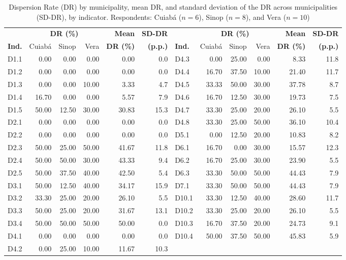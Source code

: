 \documentclass[12pt]{article}
\begin{document}
\begin{table}[tb]
\centering\footnotesize
\setlength{\tabcolsep}{4pt}
\caption{Dispersion Rate (DR) by municipality, mean DR, and standard deviation of the DR across municipalities (SD-DR), by indicator. Respondents: Cuiabá ($n=6$), Sinop ($n=8$), and Vera ($n=10$)}
\label{tab:dispersion}
\begin{tabular}{l rrrrr @{\hspace{2em}} l rrrrr}
\toprule
 & \multicolumn{3}{c}{\textbf{DR (\%)}} & \textbf{Mean} & \textbf{SD-DR}
 & & \multicolumn{3}{c}{\textbf{DR (\%)}} & \textbf{Mean} & \textbf{SD-DR} \\
\cmidrule(lr){2-4} \cmidrule(lr){8-10}
\textbf{Ind.} & Cuiabá & Sinop & Vera & \textbf{DR (\%)} & \textbf{(p.p.)}
 & \textbf{Ind.} & Cuiabá & Sinop & Vera & \textbf{DR (\%)} & \textbf{(p.p.)} \\
\midrule
D1.1 & 0.00  & 0.00  & 0.00  & 0.00  & 0.0  & D4.3  & 0.00  & 25.00 & 0.00  & 8.33  & 11.8 \\
D1.2 & 0.00  & 0.00  & 0.00  & 0.00  & 0.0  & D4.4  & 16.70 & 37.50 & 10.00 & 21.40 & 11.7 \\
D1.3 & 0.00  & 0.00  & 10.00 & 3.33  & 4.7  & D4.5  & 33.33 & 50.00 & 30.00 & 37.78 & 8.7  \\
D1.4 & 16.70 & 0.00  & 0.00  & 5.57  & 7.9  & D4.6  & 16.70 & 12.50 & 30.00 & 19.73 & 7.5  \\
D1.5 & 50.00 & 12.50 & 30.00 & 30.83 & 15.3 & D4.7  & 33.30 & 25.00 & 20.00 & 26.10 & 5.5  \\
D2.1 & 0.00  & 0.00  & 0.00  & 0.00  & 0.0  & D4.8  & 33.30 & 25.00 & 50.00 & 36.10 & 10.4 \\
D2.2 & 0.00  & 0.00  & 0.00  & 0.00  & 0.0  & D5.1  & 0.00  & 12.50 & 20.00 & 10.83 & 8.2  \\
D2.3 & 50.00 & 25.00 & 50.00 & 41.67 & 11.8 & D6.1  & 16.70 & 0.00  & 30.00 & 15.57 & 12.3 \\
D2.4 & 50.00 & 50.00 & 30.00 & 43.33 & 9.4  & D6.2  & 16.70 & 25.00 & 30.00 & 23.90 & 5.5  \\
D2.5 & 50.00 & 37.50 & 40.00 & 42.50 & 5.4  & D6.3  & 33.30 & 50.00 & 50.00 & 44.43 & 7.9  \\
D3.1 & 50.00 & 12.50 & 40.00 & 34.17 & 15.9 & D7.1  & 33.30 & 50.00 & 50.00 & 44.43 & 7.9  \\
D3.2 & 33.30 & 25.00 & 20.00 & 26.10 & 5.5  & D10.1 & 33.30 & 12.50 & 40.00 & 28.60 & 11.7 \\
D3.3 & 50.00 & 25.00 & 20.00 & 31.67 & 13.1 & D10.2 & 33.30 & 25.00 & 20.00 & 26.10 & 5.5  \\
D3.4 & 50.00 & 50.00 & 50.00 & 50.00 & 0.0  & D10.3 & 16.70 & 37.50 & 20.00 & 24.73 & 9.1  \\
D4.1 & 0.00  & 0.00  & 0.00  & 0.00  & 0.0  & D10.4 & 50.00 & 37.50 & 50.00 & 45.83 & 5.9  \\
D4.2 & 0.00  & 25.00 & 10.00 & 11.67 & 10.3 &       &       &       &       &       &      \\
\bottomrule
\end{tabular}
\end{table}
\end{document}

